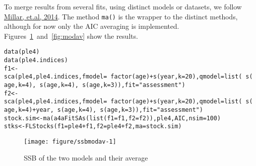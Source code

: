\documentclass[a4paper,english,10pt]{article}\usepackage[]{graphicx}\usepackage[]{color}
\makeatletter
\def\maxwidth{ %
  \ifdim\Gin@nat@width>\linewidth
    \linewidth
  \else
    \Gin@nat@width
  \fi
}
\newcommand{\hlnum}[1]{\textcolor[rgb]{0.2,0.2,0.2}{#1}}%
\newcommand{\hlstr}[1]{\textcolor[rgb]{0.2,0.2,0.2}{#1}}%
\newcommand{\hlopt}[1]{\textcolor[rgb]{0.2,0.2,0.2}{#1}}%
\newcommand{\hlstd}[1]{\textcolor[rgb]{0,0,0}{#1}}%
\newcommand{\hlkwb}[1]{\textcolor[rgb]{0.361,0.506,0.596}{#1}}%
\newcommand{\hlkwc}[1]{\textcolor[rgb]{0.361,0.506,0.596}{#1}}%
\newcommand{\hlkwd}[1]{\textcolor[rgb]{0.361,0.506,0.596}{#1}}%
\newenvironment{kframe}{%
 \def\at@end@of@kframe{}%
 \ifinner\ifhmode%
  \def\at@end@of@kframe{\end{minipage}}%
  \begin{minipage}{\columnwidth}%
 \fi\fi%
 \def\FrameCommand##1{\hskip\@totalleftmargin \hskip-\fboxsep
 \colorbox{shadecolor}{##1}\hskip-\fboxsep
     \hskip-\linewidth \hskip-\@totalleftmargin \hskip\columnwidth}%
 \MakeFramed {\advance\hsize-\width
   \@totalleftmargin\z@ \linewidth\hsize
   \@setminipage}}%
 {\par\unskip\endMakeFramed%
 \at@end@of@kframe}
\newenvironment{knitrout}{}{} %
\newcommand{\code}[1]{{\texttt{#1}}}
\makeatother
\begin{document}
To merge results from several fits, using distinct models or datasets, we follow \href{http://icesjms.oxfordjournals.org/content/early/2014/03/31/icesjms.fsu043.abstract}{Millar, et.al, 2014}. The method \code{ma()} is the wrapper to the distinct methods, although for now only the AIC averaging is implemented. Figures~\ref{fig:ssbmodav}~and~\ref{fig:modav} show the results. 

\begin{knitrout}
\color{fgcolor}\begin{kframe}
\begin{alltt}
\hlkwd{data}\hlstd{(ple4)}
\hlkwd{data}\hlstd{(ple4.indices)}
\hlstd{f1} \hlkwb{<-} \hlkwd{sca}\hlstd{(ple4, ple4.indices,} \hlkwc{fmodel}\hlstd{=}\hlopt{~} \hlkwd{factor}\hlstd{(age)} \hlopt{+} \hlkwd{s}\hlstd{(year,} \hlkwc{k}\hlstd{=}\hlnum{20}\hlstd{),} \hlkwc{qmodel}\hlstd{=}\hlkwd{list}\hlstd{(}\hlopt{~} \hlkwd{s}\hlstd{(age,} \hlkwc{k} \hlstd{=} \hlnum{4}\hlstd{),} \hlopt{~} \hlkwd{s}\hlstd{(age,} \hlkwc{k} \hlstd{=} \hlnum{4}\hlstd{),} \hlopt{~} \hlkwd{s}\hlstd{(age,} \hlkwc{k} \hlstd{=} \hlnum{3}\hlstd{)),} \hlkwc{fit} \hlstd{=} \hlstr{"assessment"}\hlstd{)}
\hlstd{f2} \hlkwb{<-} \hlkwd{sca}\hlstd{(ple4, ple4.indices,} \hlkwc{fmodel}\hlstd{=}\hlopt{~} \hlkwd{factor}\hlstd{(age)} \hlopt{+} \hlkwd{s}\hlstd{(year,} \hlkwc{k}\hlstd{=}\hlnum{20}\hlstd{),} \hlkwc{qmodel}\hlstd{=}\hlkwd{list}\hlstd{(}\hlopt{~} \hlkwd{s}\hlstd{(age,} \hlkwc{k} \hlstd{=} \hlnum{4}\hlstd{)}\hlopt{+}\hlstd{year,} \hlopt{~} \hlkwd{s}\hlstd{(age,} \hlkwc{k} \hlstd{=} \hlnum{4}\hlstd{),} \hlopt{~} \hlkwd{s}\hlstd{(age,} \hlkwc{k} \hlstd{=} \hlnum{3}\hlstd{)),} \hlkwc{fit} \hlstd{=} \hlstr{"assessment"}\hlstd{)}
\hlstd{stock.sim} \hlkwb{<-} \hlkwd{ma}\hlstd{(}\hlkwd{a4aFitSAs}\hlstd{(}\hlkwd{list}\hlstd{(}\hlkwc{f1}\hlstd{=f1,} \hlkwc{f2}\hlstd{=f2)), ple4, AIC,} \hlkwc{nsim} \hlstd{=} \hlnum{100}\hlstd{)}
\hlstd{stks} \hlkwb{<-} \hlkwd{FLStocks}\hlstd{(}\hlkwc{f1}\hlstd{=ple4}\hlopt{+}\hlstd{f1,} \hlkwc{f2}\hlstd{=ple4}\hlopt{+}\hlstd{f2,} \hlkwc{ma}\hlstd{=stock.sim)}
\end{alltt}
\end{kframe}
\end{knitrout}

\begin{knitrout}
\color{fgcolor}\begin{figure}[H]

{\centering \texttt{[image: figure/ssbmodav-1]} 

}

\caption[SSB of the two models and their average]{SSB of the two models and their average\label{fig:ssbmodav}}
\end{figure}


\end{knitrout}
\end{document}
